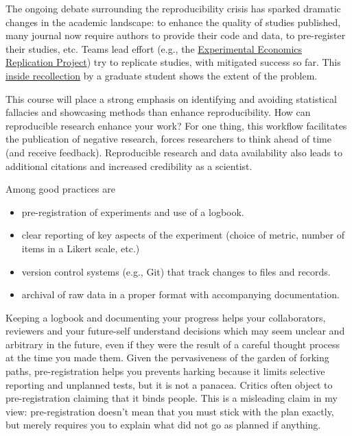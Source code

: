 \documentclass[
  11pt,
  letterpaper,
]{scrbook}
\providecommand{\tightlist}{%
  \setlength{\itemsep}{0pt}\setlength{\parskip}{0pt}}\usepackage{longtable,booktabs,array}
\theoremstyle{definition}
\theoremstyle{definition}
\theoremstyle{remark}
\begin{document}
The ongoing debate surrounding the reproducibility crisis has sparked
dramatic changes in the academic landscape: to enhance the quality of
studies published, many journal now require authors to provide their
code and data, to pre-register their studies, etc. Teams lead effort
(e.g., the
\href{https://experimentaleconreplications.com/studies.html}{Experimental
Economics Replication Project}) try to replicate studies, with mitigated
success so far. This
\href{https://devonprice.medium.com/questionable-research-practices-ive-taken-part-in-754b74dcaa51}{inside
recollection} by a graduate student shows the extent of the problem.

This course will place a strong emphasis on identifying and avoiding
statistical fallacies and showcasing methods than enhance
reproducibility. How can reproducible research enhance your work? For
one thing, this workflow facilitates the publication of negative
research, forces researchers to think ahead of time (and receive
feedback). Reproducible research and data availability also leads to
additional citations and increased credibility as a scientist.

Among good practices are

\begin{itemize}
\tightlist
\item
  pre-registration of experiments and use of a logbook.
\item
  clear reporting of key aspects of the experiment (choice of metric,
  number of items in a Likert scale, etc.)
\item
  version control systems (e.g., Git) that track changes to files and
  records.
\item
  archival of raw data in a proper format with accompanying
  documentation.
\end{itemize}

Keeping a logbook and documenting your progress helps your
collaborators, reviewers and your future-self understand decisions which
may seem unclear and arbitrary in the future, even if they were the
result of a careful thought process at the time you made them. Given the
pervasiveness of the garden of forking paths, pre-registration helps you
prevents harking because it limits selective reporting and unplanned
tests, but it is not a panacea. Critics often object to pre-registration
claiming that it binds people. This is a misleading claim in my view:
pre-registration doesn't mean that you must stick with the plan exactly,
but merely requires you to explain what did not go as planned if
anything.
\end{document}
